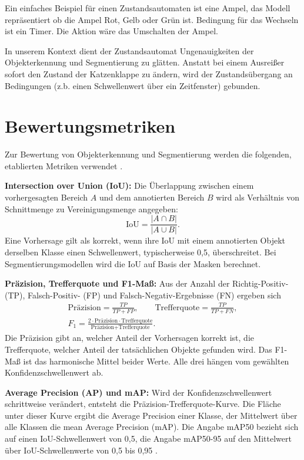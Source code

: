 Ein einfaches Beispiel für einen Zustandsautomaten ist eine Ampel, das Modell repräsentiert ob die Ampel Rot, Gelb oder Grün ist. Bedingung für das Wechseln ist ein Timer. Die Aktion wäre das Umschalten der Ampel.

In unserem Kontext dient der Zustandsautomat Ungenauigkeiten der Objekterkennung und Segmentierung zu glätten. Anstatt bei einem Ausreißer sofort den Zustand der Katzenklappe zu ändern, wird der Zustandsübergang an Bedingungen (z.b. einen Schwellenwert über ein Zeitfenster) gebunden.

\section{Bewertungsmetriken}
\label{sec:metriken}
Zur Bewertung von Objekterkennung und Segmentierung werden die folgenden, etablierten Metriken verwendet \cite{everingham2010pascal, lin2014coco}.

\textbf{Intersection over Union (IoU):} Die Überlappung zwischen einem vorhergesagten Bereich $A$ und dem annotierten Bereich $B$ wird als Verhältnis von Schnittmenge zu Vereinigungsmenge angegeben:
\begin{equation}
	\mathrm{IoU} = \frac{|A \cap B|}{|A \cup B|}.
\end{equation}
Eine Vorhersage gilt als korrekt, wenn ihre IoU mit einem annotierten Objekt derselben Klasse einen Schwellenwert, typischerweise 0,5, überschreitet. Bei Segmentierungsmodellen wird die IoU auf Basis der Masken berechnet.

\textbf{Präzision, Trefferquote und F1-Maß:} Aus der Anzahl der Richtig-Positiv- (TP), Falsch-Positiv- (FP) und Falsch-Negativ-Ergebnisse (FN) ergeben sich
\begin{gather}
	\text{Präzision} = \frac{TP}{TP + FP}, \qquad
	\text{Trefferquote} = \frac{TP}{TP + FN}, \\
	F_1 = \frac{2 \cdot \text{Präzision} \cdot \text{Trefferquote}}{\text{Präzision} + \text{Trefferquote}}.
\end{gather}
Die Präzision gibt an, welcher Anteil der Vorhersagen korrekt ist, die Trefferquote, welcher Anteil der tatsächlichen Objekte gefunden wird. Das F1-Maß ist das harmonische Mittel beider Werte. Alle drei hängen vom gewählten Konfidenzschwellenwert ab.

\textbf{Average Precision (AP) und mAP:} Wird der Konfidenzschwellenwert schrittweise verändert, entsteht die Präzision-Trefferquote-Kurve. Die Fläche unter dieser Kurve ergibt die Average Precision einer Klasse, der Mittelwert über alle Klassen die mean Average Precision (mAP). Die Angabe mAP50 bezieht sich auf einen IoU-Schwellenwert von 0,5, die Angabe mAP50-95 auf den Mittelwert über IoU-Schwellenwerte von 0,5 bis 0,95 \cite{lin2014coco}.

